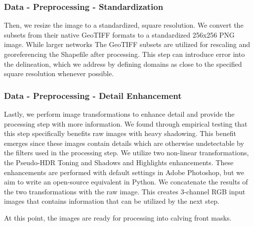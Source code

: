 \documentclass[tc, manuscript]{copernicus}
\begin{document}
\subsubsection{Data - Preprocessing - Standardization}
Then, we resize the image to a standardized, square resolution. We convert the subsets from their native GeoTIFF formats to a standardized 256x256 PNG image. While larger networks The GeoTIFF subsets are utilized for rescaling and georeferencing the Shapefile after processing. This step can introduce error into the delineation, which we address by defining domains as close to the specified square resolution whenever possible.

\subsubsection{Data - Preprocessing - Detail Enhancement}
Lastly, we perform image transformations to enhance detail and provide the processing step with more information. We found through empirical testing that this step specifically benefits raw images with heavy shadowing. This benefit emerges since these images contain details which are otherwise undetectable by the filters used in the processing step. We utilize two non-linear transformations, the Pseudo-HDR Toning and Shadows and Highlights enhancements. These enhancements are performed with default settings in Adobe Photoshop, but we aim to write an open-source equivalent in Python. We concatenate the results of the two transformations with the raw image. This creates 3-channel RGB input images that contains information that can be utilized by the next step. 

At this point, the images are ready for processing into calving front masks.

\end{document}
